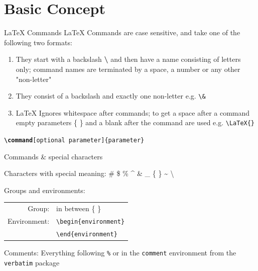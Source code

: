 \documentclass[presentation, aspectratio=1610]{beamer}
\begin{document}
	\section{Basic Concept}
	\begin{frame}{\LaTeX{} Commands}
	\LaTeX{} Commands are case sensitive, and take one of the following two formats:
	\begin{enumerate}[<+->]
		\item They start with a backslash \textbf{\textbackslash{}} and then have a name consisting of letters only; command names are terminated by a space, a number or
		any other "non-letter"
		\item They consist of a backslash and exactly one non-letter e.g. \texttt{\textbackslash \&}
		\item \LaTeX{} Ignores whitespace after commands; to get a space after a command empty parameters \{ \} and a blank after the command are used e.g. \texttt{\textbackslash LaTeX\{\}}
	\end{enumerate}
	\begin{block}{}\centering
	\texttt{\textbf{\textbackslash command}[optional parameter]\{parameter\}}
	\end{block}
	\end{frame}
	\begin{frame}{Commands \& special characters}
	\begin{exampleblock}{Characters with special meaning:}
		\centering
		\# \$ \% \^{} \& \_ \{ \} \~{} \textbackslash
	\end{exampleblock}
	\pause
	\begin{block}{Groups and environments:}
		\begin{tabular}{rl}
			Group:& in between \{ \} \\
			Environment:&  \texttt{\textbackslash begin\{environment\}}\\
			& \texttt{\textbackslash  end\{environment\}}
		\end{tabular}
	\end{block}
	\pause
	\begin{block}{Comments:}
		Everything following \texttt{\%} or in the \texttt{comment} environment from the \texttt{verbatim} package
	\end{block}
	\end{frame}
\end{document}
